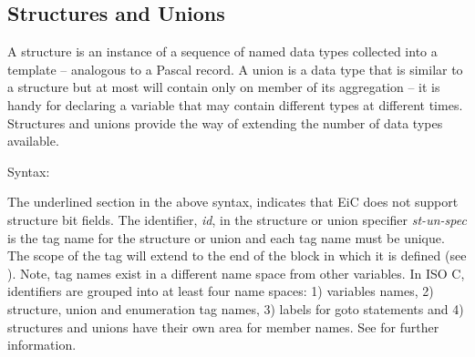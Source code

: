 \subsection{Structures and Unions}
\label{sec:structures}
 

A structure is an instance of a sequence of  named data types
collected into a template -- analogous to a Pascal record. A union is
a data type that is similar to a structure but at most will contain
only on member of its aggregation -- it is handy for declaring a
variable that may contain different types at different
times. Structures and unions provide the way of extending the number
of data types available.

Syntax: \begin{quote} 
\end{quote}

The underlined section in the above syntax, indicates that EiC does
not support structure bit fields. The identifier, {\it id}, in the
structure or union specifier {\it st-un-spec} is the tag name for the
structure or union and each tag name must be unique. The scope of the
tag will extend to the end of the block in which it is defined (see
). Note, tag names exist in a different name space
from other variables.  In ISO C, identifiers are grouped into at
least four name spaces: 1) variables names, 2) structure, union and
enumeration tag names, 3) labels for goto statements and 4)
structures and unions have their own area for member names. See
 for further information.

